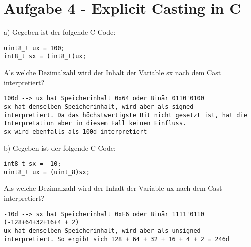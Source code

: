\section*{Aufgabe 4 - Explicit Casting in C}
a) Gegeben ist der folgende C Code:

\begin{verbatim}
uint8_t ux = 100;
int8_t sx = (int8_t)ux;
\end{verbatim}

Als welche Dezimalzahl wird der Inhalt der Variable sx nach dem Cast interpretiert?

\begin{verbatim}
100d --> ux hat Speicherinhalt 0x64 oder Binär 0110'0100
sx hat denselben Speicherinhalt, wird aber als signed
interpretiert. Da das höchstwertigste Bit nicht gesetzt ist, hat die
Interpretation aber in diesem Fall keinen Einfluss.
sx wird ebenfalls als 100d interpretiert
\end{verbatim}

b) Gegeben ist der folgende C Code:

\begin{verbatim}
int8_t sx = -10;
uint8_t ux = (uint_8)sx;
\end{verbatim}

Als welche Dezimalzahl wird der Inhalt der Variable ux nach dem Cast interpretiert?

\begin{verbatim}
-10d --> sx hat Speicherinhalt 0xF6 oder Binär 1111'0110
(-128+64+32+16+4 + 2)
ux hat denselben Speicherinhalt, wird aber als unsigned
interpretiert. So ergibt sich 128 + 64 + 32 + 16 + 4 + 2 = 246d
\end{verbatim}